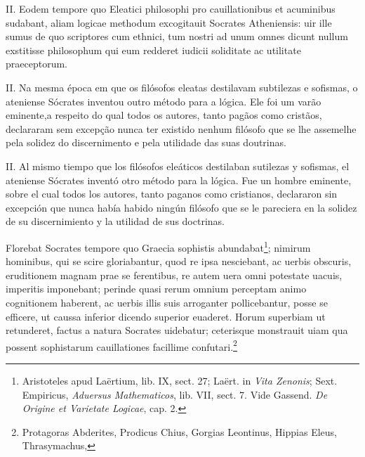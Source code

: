\documentclass{article}
\begin{document}
\begin{paracol}{3}
\begin{nthcolumn}{2}
  \end{nthcolumn}
  \vspace{0.5cm}
  \begin{nthcolumn*}{0} %
    II. Eodem tempore quo Eleatici philosophi pro cauillationibus et acuminibus sudabant, aliam logicae methodum excogitauit Socrates Atheniensis: uir ille sumus de quo scriptores cum ethnici, tum nostri ad unum omnes dicunt nullum exstitisse philosophum qui eum redderet iudicii soliditate ac utilitate praeceptorum. 
  \end{nthcolumn*}
  \vspace{0.5cm}
  \begin{nthcolumn}{1} %
    II. Na mesma época em que os filósofos eleatas destilavam subtilezas e sofismas, o ateniense Sócrates inventou outro método para a lógica. Ele foi um varão eminente,a respeito do qual todos os autores, tanto pagãos como cristãos, declararam sem excepção nunca ter existido nenhum filósofo que se lhe assemelhe pela solidez do discernimento e pela utilidade das suas doutrinas.
  \end{nthcolumn}
  \vspace{0.5cm}
  \begin{nthcolumn}{2} %
    II. Al mismo tiempo que los filósofos eleáticos destilaban sutilezas y sofismas, el ateniense Sócrates inventó otro método para la lógica. Fue un hombre eminente, sobre el cual todos los autores, tanto paganos como cristianos, declararon sin excepción que nunca había habido ningún filósofo que se le pareciera en la solidez de su discernimiento y la utilidad de sus doctrinas.
  \end{nthcolumn}
  \vspace{0.5cm}
  \begin{nthcolumn*}{0} %
    Florebat Socrates tempore quo Graecia sophistis abundabat\footnote[16]{Aristoteles apud Laërtium, lib. IX, sect. 27; Laërt. in \emph{Vita Zenonis}; Sext. Empiricus, \emph{Aduersus Mathematicos}, lib. VII, sect. 7. Vide Gassend. \emph{De Origine et Varietate Logicae}, cap. 2.}; nimirum hominibus, qui se scire gloriabantur, quod re ipsa nesciebant, ac uerbis obscuris, eruditionem magnam prae se ferentibus, re autem uera omni potestate uacuis, imperitis imponebant; perinde quasi rerum omnium perceptam animo cognitionem haberent, ac uerbis illis suis arroganter pollicebantur, posse se efficere, ut caussa inferior dicendo superior euaderet. Horum superbiam ut retunderet, factus a natura Socrates uidebatur; ceterisque monstrauit uiam qua possent sophistarum cauillationes facillime confutari.\footnote[17]{Protagoras Abderites, Prodicus Chius, Gorgias Leontinus, Hippias Eleus, Thrasymachus,
}
\end{nthcolumn*}
\end{paracol}
\end{document}
